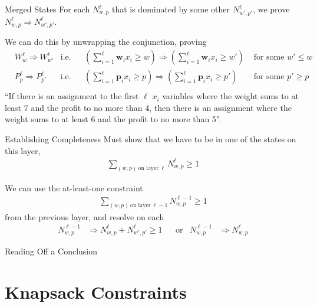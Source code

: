 \documentclass[aspectratio=169,compress,10pt]{beamer}
\begin{document}
\begin{frame}{Merged States}
    For each $N^\ell_{w,p}$ that is dominated by some other $N^\ell_{w',p'}$, we prove
        $N^\ell_{w,p} \Rightarrow N^\ell_{w',p'}$.

        \medskip

    We can do this by unwrapping the conjunction, proving
    \begin{align*}
        & W^\ell_{w} \Rightarrow W^\ell_{w'} & \text{i.e.} && (\sum_{i=1}^{\ell} \boldsymbol{w}_i
        x_i \ge w) \Rightarrow (\sum_{i=1}^{\ell} \boldsymbol{w}_i x_i \ge w') &\text{~for some~} w' \le w \\
        & P^\ell_{p} \Rightarrow P^\ell_{p'} & \text{i.e.} && (\sum_{i=1}^{\ell} \boldsymbol{p}_i
        x_i \ge p) \Rightarrow (\sum_{i=1}^{\ell} \boldsymbol{p}_i x_i \ge p') &\text{~for some~} p' \ge p \\
    \end{align*}
    ``If there is an assignment to the first $\ell$ $x_i$ variables where the weight sums to at
    least 7 and the profit to no more than 4, then there is an assignment where the weight sums
    to at least 6 and the profit to no more than 5''.
\end{frame}

\begin{frame}{Establishing Completeness}
    Must show that we have to be in one of the states on this layer,
    \begin{align*}
        \sum_{(w,p)~\text{on layer}~\ell} N^\ell_{w,p} \ge 1
    \end{align*}

    We can use the at-least-one constraint
    \begin{align*}
        \sum_{(w,p)~\text{on layer}~\ell - 1} N^{\ell-1}_{w,p} \ge 1
    \end{align*}
    from the previous layer, and resolve on each \begin{align*}
        N^{\ell-1}_{w,p} &\Rightarrow N^\ell_{w,p} + N^\ell_{w',p'} \ge 1 &&\text{or}&
        N^{\ell-1}_{w,p} &\Rightarrow N^\ell_{w,p}
    \end{align*}
\end{frame}

\begin{frame}{Reading Off a Conclusion}
\end{frame}

\section{Knapsack Constraints}
\end{document}

